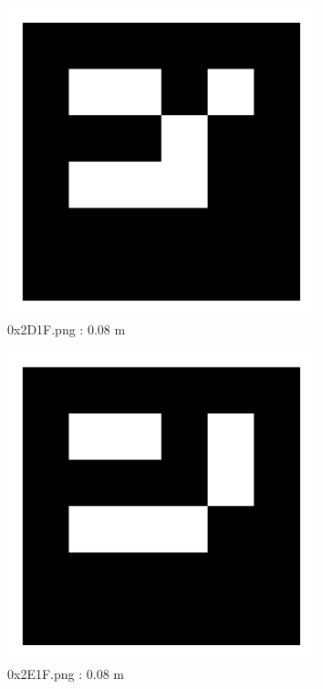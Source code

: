 \documentclass[11pt,a4,BCOR=0cm]{scrartcl}
\begin{document}
\begin{figure}
  \centering
    \includegraphics[width=8.955cm]{0x2D1F.pdf}
    \caption{0x2D1F.png : 0.08 m}
    \label{fig:0x2D1F.pdf}
  
\end{figure} 

\begin{figure}
  \centering
    \includegraphics[width=8.955cm]{0x2E1F.pdf}
    \caption{0x2E1F.png : 0.08 m}
    \label{fig:0x2E1F.pdf}
  
\end{figure} 

\clearpage
\end{document}
